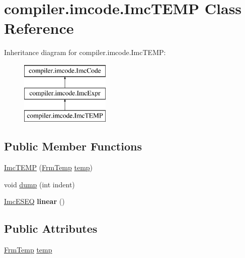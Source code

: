 \hypertarget{classcompiler_1_1imcode_1_1_imc_t_e_m_p}{}\section{compiler.\+imcode.\+Imc\+T\+E\+MP Class Reference}
\label{classcompiler_1_1imcode_1_1_imc_t_e_m_p}
Inheritance diagram for compiler.\+imcode.\+Imc\+T\+E\+MP\+:\begin{figure}[H]
\begin{center}
\leavevmode
\includegraphics[height=3.000000cm]{classcompiler_1_1imcode_1_1_imc_t_e_m_p}
\end{center}
\end{figure}
\subsection*{Public Member Functions}
\begin{DoxyCompactItemize}
\item 
\hyperlink{classcompiler_1_1imcode_1_1_imc_t_e_m_p_a3bb8a4ba1ad1c5438540b1bb68ce1124}{Imc\+T\+E\+MP} (\hyperlink{classcompiler_1_1frames_1_1_frm_temp}{Frm\+Temp} \hyperlink{classcompiler_1_1imcode_1_1_imc_t_e_m_p_a6435726b03211d4ba6cbd998ad3af0fd}{temp})
\item 
void \hyperlink{classcompiler_1_1imcode_1_1_imc_t_e_m_p_a82939878ffb278c30d503b0d775626bd}{dump} (int indent)
\item 
\mbox{\label{classcompiler_1_1imcode_1_1_imc_t_e_m_p_a1186d8451ed9289cf83ef8582dfd7309}} 
\hyperlink{classcompiler_1_1imcode_1_1_imc_e_s_e_q}{Imc\+E\+S\+EQ} {\bfseries linear} ()
\end{DoxyCompactItemize}
\subsection*{Public Attributes}
\begin{DoxyCompactItemize}
\item 
\hyperlink{classcompiler_1_1frames_1_1_frm_temp}{Frm\+Temp} \hyperlink{classcompiler_1_1imcode_1_1_imc_t_e_m_p_a6435726b03211d4ba6cbd998ad3af0fd}{temp}
\end{DoxyCompactItemize}


